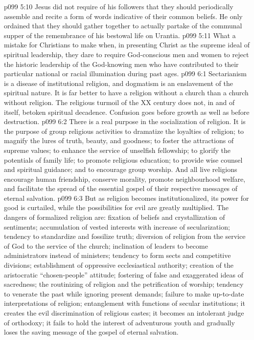 \vs p099 5:10 Jesus did not require of his followers that they should periodically assemble and recite a form of words indicative of their common beliefs. He only ordained that they should gather together to actually  partake of the communal supper of the remembrance of his bestowal life on Urantia.
\vs p099 5:11 \pc What a mistake for Christians to make when, in presenting Christ as the supreme ideal of spiritual leadership, they dare to require God\hyp{}conscious men and women to reject the historic leadership of the God\hyp{}knowing men who have contributed to their particular national or racial illumination during past ages.
\vs p099 6:1 Sectarianism is a disease of institutional religion, and dogmatism is an enslavement of the spiritual nature. It is far better to have a religion without a church than a church without religion. The religious turmoil of the XX century does not, in and of itself, betoken spiritual decadence. Confusion goes before growth as well as before destruction.
\vs p099 6:2 There is a real purpose in the socialization of religion. It is the purpose of group religious activities to dramatize the loyalties of religion; to magnify the lures of truth, beauty, and goodness; to foster the attractions of supreme values; to enhance the service of unselfish fellowship; to glorify the potentials of family life; to promote religious education; to provide wise counsel and spiritual guidance; and to encourage group worship. And all live religions encourage human friendship, conserve morality, promote neighbourhood welfare, and facilitate the spread of the essential gospel of their respective messages of eternal salvation.
\vs p099 6:3 But as religion becomes institutionalized, its power for good is curtailed, while the possibilities for evil are greatly multiplied. The dangers of formalized religion are: fixation of beliefs and crystallization of sentiments; accumulation of vested interests with increase of secularization; tendency to standardize and fossilize truth; diversion of religion from the service of God to the service of the church; inclination of leaders to become administrators instead of ministers; tendency to form sects and competitive divisions; establishment of oppressive ecclesiastical authority; creation of the aristocratic “chosen\hyp{}people” attitude; fostering of false and exaggerated ideas of sacredness; the routinizing of religion and the petrification of worship; tendency to venerate the past while ignoring present demands; failure to make up\hyp{}to\hyp{}date interpretations of religion; entanglement with functions of secular institutions; it creates the evil discrimination of religious castes; it becomes an intolerant judge of orthodoxy; it fails to hold the interest of adventurous youth and gradually loses the saving message of the gospel of eternal salvation.
